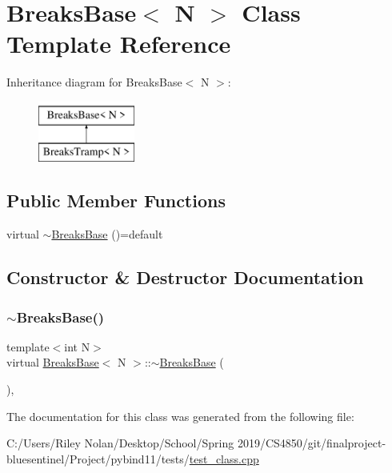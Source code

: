\hypertarget{class_breaks_base}{}\section{Breaks\+Base$<$ N $>$ Class Template Reference}
\label{class_breaks_base}
Inheritance diagram for Breaks\+Base$<$ N $>$\+:\begin{figure}[H]
\begin{center}
\leavevmode
\includegraphics[height=2.000000cm]{class_breaks_base}
\end{center}
\end{figure}
\subsection*{Public Member Functions}
\begin{DoxyCompactItemize}
\item 
virtual \mbox{\hyperlink{class_breaks_base_a39c28d10ef8f99834cfa8422c2825fb9}{$\sim$\+Breaks\+Base}} ()=default
\end{DoxyCompactItemize}


\subsection{Constructor \& Destructor Documentation}
\mbox{\label{class_breaks_base_a39c28d10ef8f99834cfa8422c2825fb9}} 
\subsubsection{\texorpdfstring{$\sim$BreaksBase()}{~BreaksBase()}}
{\footnotesize\ttfamily template$<$int N$>$ \\
virtual \mbox{\hyperlink{class_breaks_base}{Breaks\+Base}}$<$ N $>$\+::$\sim$\mbox{\hyperlink{class_breaks_base}{Breaks\+Base}} (\begin{DoxyParamCaption}{ }\end{DoxyParamCaption})\hspace{0.3cm}{\ttfamily [virtual]}, {\ttfamily [default]}}



The documentation for this class was generated from the following file\+:\begin{DoxyCompactItemize}
\item 
C\+:/\+Users/\+Riley Nolan/\+Desktop/\+School/\+Spring 2019/\+C\+S4850/git/finalproject-\/bluesentinel/\+Project/pybind11/tests/\mbox{\hyperlink{test__class_8cpp}{test\+\_\+class.\+cpp}}\end{DoxyCompactItemize}
